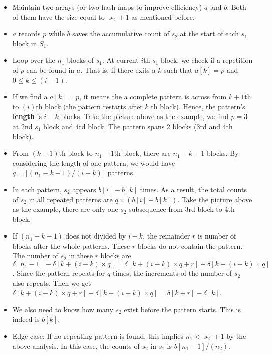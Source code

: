 \begin{itemize}
\item Maintain two arrays (or two hash maps to improve efficiency) $a$ and $b$. Both of them have the size equal to $\lvert s_2\rvert+1$ as mentioned before.
\item $a$ records $p$ while $b$ saves the accumulative count of $s_2$ at the start of each $s_1$ block in $S_1$.
\item Loop over the $n_1$ blocks of $s_1$. At current $i$th $s_1$ block, we check if a repetition of $p$ can be found in $a$. That is, if there exits a $k$ such that $a[k] = p$ and $0\leq k\leq (i-1)$.
\item If we find a $a[k]=p$, it means the a complete pattern is across from $k+1$th to $(i)$th block (the pattern restarts after $k$ th block). Hence, the pattern's \textbf{length} is $i-k$ blocks. Take the picture above as the example, we find $p=3$ at 2nd $s_1$ block and 4rd block. The pattern spans 2 blocks (3rd and 4th block).
\item From $(k+1)$th block to $n_1-1$th block, there are $n_1-k-1$ blocks. By considering the length of one pattern, we would have $q= \lfloor (n_1-k-1)/(i-k)\rfloor$ patterns.
\item In each pattern, $s_2$ appears $b[i] - b[k]$ times. As a result, the total counts of $s_2$ in all repeated patterns are $q\times (b[i]-b[k])$.  Take the picture above as the example, there are only one $s_2$ subsequence from 3rd block to 4th block.
\item If $(n_1-k-1)$ does not divided by $i-k$, the remainder $r$ is number of blocks after the whole patterns. These $r$ blocks do not contain the pattern. The number of $s_2$ in these $r$ blocks are $\delta[n_1-1] - \delta[k+(i-k)\times q] = \delta[k+(i-k)\times q + r] - \delta[k+(i-k)\times q]$. Since the pattern repeats for $q$ times, the increments of the number of $s_2$ also repeats. Then we get $\delta[k+(i-k)\times q + r] - \delta[k+(i-k)\times q] = \delta[k+r]-\delta[k]$. 
\item We also need to know how many $s_2$ exist before the pattern starts. This is indeed is $b[k]$.
\item Edge case: If no repeating pattern is found, this implies $n_1 < \lvert s_2\rvert+1$ by the above analysis. In this case, the counts of $s_2$ in $s_1$ is $b[n_1-1]/(n_2)$.
\end{itemize}

